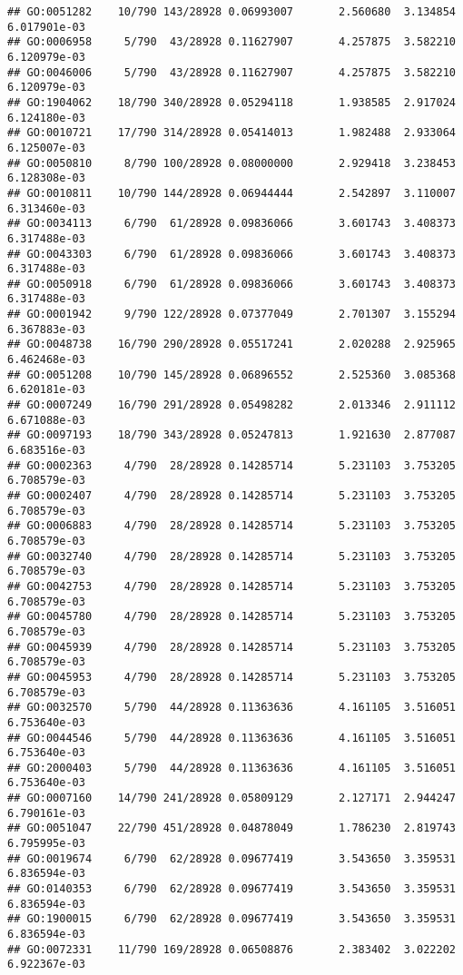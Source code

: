 \documentclass[
]{article}
\begin{document}
\begin{verbatim}
## GO:0051282    10/790 143/28928 0.06993007       2.560680  3.134854 6.017901e-03
## GO:0006958     5/790  43/28928 0.11627907       4.257875  3.582210 6.120979e-03
## GO:0046006     5/790  43/28928 0.11627907       4.257875  3.582210 6.120979e-03
## GO:1904062    18/790 340/28928 0.05294118       1.938585  2.917024 6.124180e-03
## GO:0010721    17/790 314/28928 0.05414013       1.982488  2.933064 6.125007e-03
## GO:0050810     8/790 100/28928 0.08000000       2.929418  3.238453 6.128308e-03
## GO:0010811    10/790 144/28928 0.06944444       2.542897  3.110007 6.313460e-03
## GO:0034113     6/790  61/28928 0.09836066       3.601743  3.408373 6.317488e-03
## GO:0043303     6/790  61/28928 0.09836066       3.601743  3.408373 6.317488e-03
## GO:0050918     6/790  61/28928 0.09836066       3.601743  3.408373 6.317488e-03
## GO:0001942     9/790 122/28928 0.07377049       2.701307  3.155294 6.367883e-03
## GO:0048738    16/790 290/28928 0.05517241       2.020288  2.925965 6.462468e-03
## GO:0051208    10/790 145/28928 0.06896552       2.525360  3.085368 6.620181e-03
## GO:0007249    16/790 291/28928 0.05498282       2.013346  2.911112 6.671088e-03
## GO:0097193    18/790 343/28928 0.05247813       1.921630  2.877087 6.683516e-03
## GO:0002363     4/790  28/28928 0.14285714       5.231103  3.753205 6.708579e-03
## GO:0002407     4/790  28/28928 0.14285714       5.231103  3.753205 6.708579e-03
## GO:0006883     4/790  28/28928 0.14285714       5.231103  3.753205 6.708579e-03
## GO:0032740     4/790  28/28928 0.14285714       5.231103  3.753205 6.708579e-03
## GO:0042753     4/790  28/28928 0.14285714       5.231103  3.753205 6.708579e-03
## GO:0045780     4/790  28/28928 0.14285714       5.231103  3.753205 6.708579e-03
## GO:0045939     4/790  28/28928 0.14285714       5.231103  3.753205 6.708579e-03
## GO:0045953     4/790  28/28928 0.14285714       5.231103  3.753205 6.708579e-03
## GO:0032570     5/790  44/28928 0.11363636       4.161105  3.516051 6.753640e-03
## GO:0044546     5/790  44/28928 0.11363636       4.161105  3.516051 6.753640e-03
## GO:2000403     5/790  44/28928 0.11363636       4.161105  3.516051 6.753640e-03
## GO:0007160    14/790 241/28928 0.05809129       2.127171  2.944247 6.790161e-03
## GO:0051047    22/790 451/28928 0.04878049       1.786230  2.819743 6.795995e-03
## GO:0019674     6/790  62/28928 0.09677419       3.543650  3.359531 6.836594e-03
## GO:0140353     6/790  62/28928 0.09677419       3.543650  3.359531 6.836594e-03
## GO:1900015     6/790  62/28928 0.09677419       3.543650  3.359531 6.836594e-03
## GO:0072331    11/790 169/28928 0.06508876       2.383402  3.022202 6.922367e-03

\end{verbatim}
\end{document}

